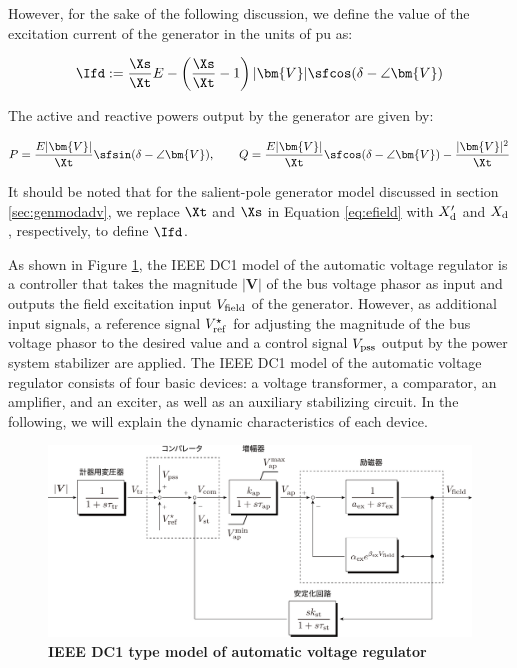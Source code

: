 \documentclass[graybox, envcountchap]{svmult}
\begin{document}
However, for the sake of the following discussion, we define the value of the
excitation current of the generator in the units of pu as:

\begin{equation}\label{eq:efield}
  \Ifd := \frac{ \Xs }{ \Xt }E
  -\left(
  \frac{ \Xs }{ \Xt }-1
  \right)
  |\bm{V}| \sfcos (\delta - \angle \bm{V} )
\end{equation}

The active and reactive powers output by the generator are given by:

\[
  P  =  \frac{E |\bm{V} |}{ \Xt } \sfsin(\delta -  \angle \bm{V}), \qquad
  Q  =  \frac{E |\bm{V} |}{ \Xt } \sfcos (\delta - \angle \bm{V}) - \frac{|\bm{V}|^2}{ \Xt }
\]

It should be noted that for the salient-pole generator model discussed in
section \ref{sec:genmodadv}, we replace $\Xt$ and $\Xs$ in Equation
\ref{eq:efield} with $X_{{\rm d}}'$ and $X_{\rm d}$, respectively, to define
$\Ifd$.

As shown in Figure \ref{fig:avrdc1}, the IEEE DC1 model of the automatic voltage
regulator is a controller that takes the magnitude $|\bm{V}|$ of the bus voltage
phasor as input and outputs the field excitation input $V_{\rm field}$ of the
generator. However, as additional input signals, a reference signal $V_{\rm
ref}^{\star}$ for adjusting the magnitude of the bus voltage phasor to the
desired value and a control signal $V_{\rm pss}$ output by the power system
stabilizer are applied. The IEEE DC1 model of the automatic voltage regulator
consists of four basic devices: a voltage transformer, a comparator, an
amplifier, and an exciter, as well as an auxiliary stabilizing circuit. In the
following, we will explain the dynamic characteristics of each device.

\begin{figure}[t]
  \centering
  \includegraphics[width = 0.99\linewidth]{figs/avrdc1}
  \medskip
  \caption{\textbf{IEEE DC1 type model of automatic voltage regulator}}
  \label{fig:avrdc1}
  \medskip
\end{figure}
\end{document}
